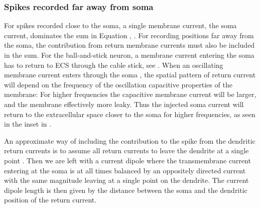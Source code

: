 \subsubsection{Spikes recorded far away from soma}
\label{sec:Spikes:far-spikes}
For spikes recorded close to the soma, a single membrane current, the soma current, dominates the sum in Equation , . For recording positions far away from the soma, the contribution from return membrane currents must also be included in the sum. For the ball-and-stick neuron, a membrane current entering the soma has to return to ECS through the cable stick, see . When an oscillating membrane current enters through the soma , the spatial pattern of return current will depend on the frequency of the oscillation  capacitive properties of the membrane: For higher frequencies the capacitive membrane current will be larger, and the membrane effectively more leaky. Thus the injected soma current will return to the extracellular space closer to the soma for higher frequencies, as  seen in the inset in .  

An approximate way of including the contribution to the spike from the dendritic return currents is to assume all return currents to leave the dendrite at a single point .  Then we are left with a current dipole where the transmembrane current entering at the soma is at all times balanced by an oppositely directed current with the same magnitude leaving at a single point on the dendrite. The current dipole length is then given by the distance between the soma and the dendritic position of the return current.  

